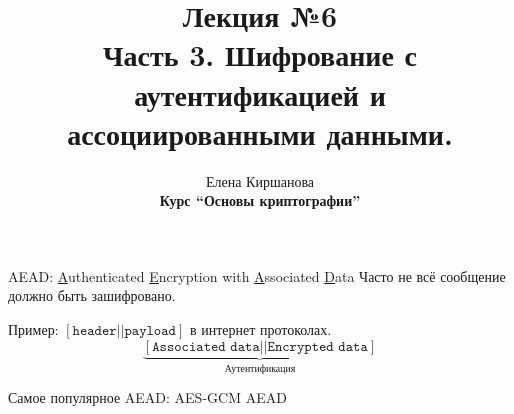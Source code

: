 \documentclass[usenames,dvipsnames,8pt,aspectratio=169]{beamer}
\title{Лекция №6 \\[10pt]
	Часть 3. Шифрование с аутентификацией и ассоциированными данными.}
\date{ Елена Киршанова \\  \textbf{Курс ``Основы криптографии''} \\  }
\begin{document}
	
\begin{frame}
	\titlepage
\end{frame}

\begin{frame}{AEAD: \underline{A}uthenticated \underline{E}ncryption with \underline{A}ssociated \underline{D}ata }
	\Large
	Часто не всё сообщение должно быть зашифровано.
	
	\vspace{15pt}
	
	Пример: $[\texttt{header} || \texttt{payload} ]$ в интернет протоколах.\\
	
	\LARGE
	\[
	\underbrace{
	\left[
	\texttt{Associated data} ||
	\texttt{Encrypted data}
	\right]
	}_\text{Аутентификация}
	\]
	
	
	
	\vspace{25pt}

	Самое популярное AEAD: {\color{Orange}AES-GCM AEAD}
	
\end{frame}
\end{document}
